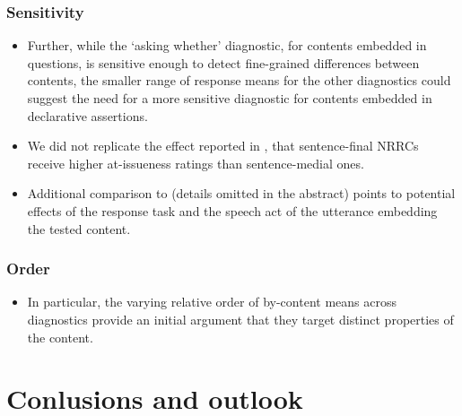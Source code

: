 \documentclass[12pt]{article}
\begin{document}
    \subsubsection{Sensitivity}

      \begin{itemize}
        \item Further, while the `asking whether' diagnostic, for contents embedded in questions, is sensitive enough to detect fine-grained differences between contents, the smaller range of response means for the other diagnostics could suggest the need for a more sensitive diagnostic for contents embedded in declarative assertions.

        \item We did not replicate the effect reported in \citealt{syrett_experimental_2015}, that sentence-final NRRCs receive higher at-issueness ratings than sentence-medial ones.

        \item  Additional comparison to \citealt{syrett_experimental_2015} (details omitted in the abstract) points to potential effects of the response task and the speech act of the utterance embedding the tested content.

      \end{itemize}

    \subsubsection{Order}

      \begin{itemize}
        \item In particular, the varying relative order of by-content means across diagnostics provide an initial argument that they target distinct properties of the content.
      \end{itemize}


\section{Conlusions and outlook}
\end{document}
